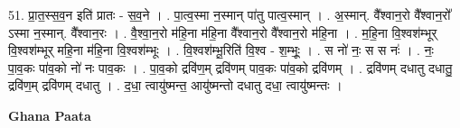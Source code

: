 \documentclass[17pt]{extarticle}
\begin{document}
51. प्रा॒त॒स्स॒व॒न इति॑ प्रातः - स॒व॒ने । . पा॒त्व॒स्मा न॒स्मान् पा॑तु पात्व॒स्मान् । . अ॒स्मान्. वै᳚श्वान॒रो वै᳚श्वान॒रो᳚ ऽस्मा न॒स्मान्. वै᳚श्वान॒रः । . वै॒श्वा॒न॒रो म॑हि॒ना म॑हि॒ना वै᳚श्वान॒रो वै᳚श्वान॒रो म॑हि॒ना । . म॒हि॒ना वि॒श्वश॑म्भूर् वि॒श्वश॑म्भूर् महि॒ना म॑हि॒ना वि॒श्वश॑म्भूः । . वि॒श्वश॑म्भू॒रिति॑ वि॒श्व - श॒म्भूः॒ । . स नो॑ नः॒ स स नः॑ । . नः॒ पा॒व॒कः पा॑व॒को नो॑ नः पाव॒कः । . पा॒व॒को द्रवि॑ण॒म् द्रवि॑णम् पाव॒कः पा॑व॒को द्रवि॑णम् । . द्रवि॑णम् दधातु दधातु॒ द्रवि॑ण॒म् द्रवि॑णम् दधातु । . द॒धा॒ त्वायु॑ष्मन्त॒ आयु॑ष्मन्तो दधातु दधा॒ त्वायु॑ष्मन्तः । \newline

\textbf{Ghana Paata } \newline
\end{document}
